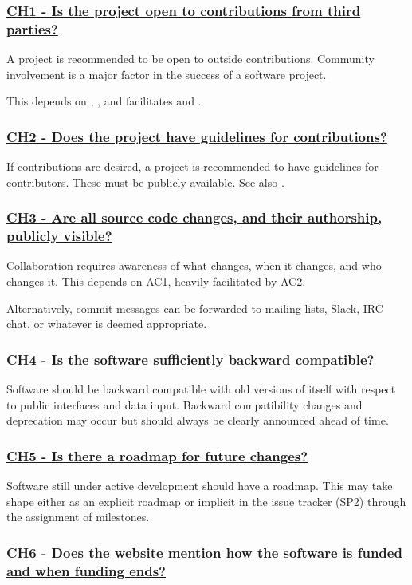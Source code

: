 \documentclass[a4paper,11pt]{article}
\newcommand{\criterion}[2]{\subsubsection*{\underline{#1 - #2}}\label{id:#1}}
\newcommand\CheckTable{%
  \begin{tabular}{ccccc}
    No & Minimal & Adequate & Good & Perfect \\
    0 & 1 & 2 & 3 & 4 \\
    \hline
    $\square$ & $\square$ & $\square$ & $\square$ & $\square$ \\
  \end{tabular}%
}
\newcommand{\refcrit}[1]{%
 \framebox[1.1\width]{\hyperref[id:#1]{#1}}
}
\begin{document}

\newcommand{\chOneID}{CH1}
\newcommand{\chOneText}{Is the project open to contributions from third parties?}
\criterion{\chOneID}{\chOneText}

A project is recommended to be open to outside contributions. Community
involvement is a major factor in the success of a software project. 

This depends on \refcrit{AC1}, \refcrit{AC2}, and facilitates \refcrit{CM1} and \refcrit{CM2}. 


\newcommand{\chTwoID}{CH2}
\newcommand{\chTwoText}{Does the project have guidelines for contributions?}
\criterion{\chTwoID}{\chTwoText}

If contributions are desired, a project is recommended to have guidelines for
contributors. These must be publicly available.
See also \refcrit{AN8}.


\newcommand{\chThreeID}{CH3}
\newcommand{\chThreeText}{Are all source code changes, and their authorship, publicly visible?}
\criterion{\chThreeID}{\chThreeText}

Collaboration requires awareness of what changes, when it changes, and who
changes it. This depends on AC1, heavily facilitated by AC2.

Alternatively, commit messages can be forwarded to mailing lists, Slack, IRC chat, or
whatever is deemed appropriate.


\newcommand{\chFourID}{CH4}
\newcommand{\chFourText}{Is the software sufficiently backward compatible?}
\criterion{\chFourID}{\chFourText}

Software should be backward compatible with old versions of itself with respect
to public interfaces and data input. Backward compatibility changes and
deprecation may occur but should always be clearly announced ahead of time.


\newcommand{\chFiveID}{CH5}
\newcommand{\chFiveText}{Is there a roadmap for future changes?}
\criterion{\chFiveID}{\chFiveText}

Software still under active development should have a roadmap. This may take
shape either as an explicit roadmap or implicit in the issue tracker
(SP2) through the assignment of milestones.


\newcommand{\chSixID}{CH6}
\newcommand{\chSixText}{Does the website mention how the software is funded and when funding ends?}
\criterion{\chSixID}{\chSixText}
\end{document}
